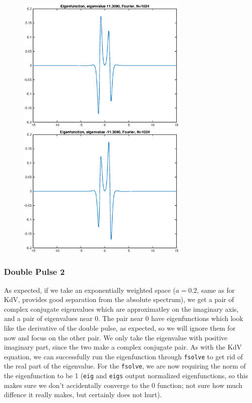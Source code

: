\documentclass[12pt]{article}
\begin{document}
\begin{figure}[H]
\includegraphics[width=8.5cm]{Sh1double1eigenfnplus}
\includegraphics[width=8.5cm]{Sh1double1eigenfnminus}
\end{figure}

\subsubsection*{Double Pulse 2}
As expected, if we take an exponentially weighted space ($a = 0.2$, same as for KdV, provides good separation from the absolute spectrum), we get a pair of complex conjugate eigenvalues which are approximatley on the imaginary axis, and a pair of eigenvalues near 0. The pair near 0 have eigenfunctions which look like the derivative of the double pulse, as expected, so we will ignore them for now and focus on the other pair. We only take the eigenvalue with positive imaginary part, since the two make a complex conjugate pair. As with the KdV equation, we can successfully run the eigenfunction through \texttt{fsolve} to get rid of the real part of the eigenvalue. For the \texttt{fsolve}, we are now requiring the norm of the eigenfunction to be 1 (\texttt{eig} and \texttt{eigs} output normalized eigenfunctions, so this makes sure we don't accidentally converge to the 0 function; not sure how much diffence it really makes, but certainly does not hurt).
\end{document}
